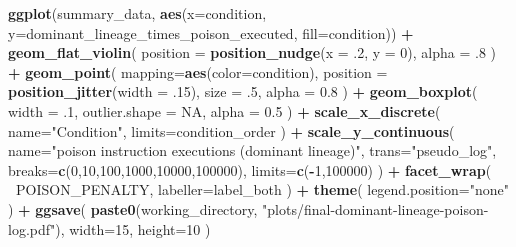 \documentclass[]{book}
\newenvironment{Shaded}{\begin{snugshade}}{\end{snugshade}}
\newcommand{\DataTypeTok}[1]{\textcolor[rgb]{0.13,0.29,0.53}{#1}}
\newcommand{\DecValTok}[1]{\textcolor[rgb]{0.00,0.00,0.81}{#1}}
\newcommand{\FloatTok}[1]{\textcolor[rgb]{0.00,0.00,0.81}{#1}}
\newcommand{\KeywordTok}[1]{\textcolor[rgb]{0.13,0.29,0.53}{\textbf{#1}}}
\newcommand{\NormalTok}[1]{#1}
\newcommand{\OperatorTok}[1]{\textcolor[rgb]{0.81,0.36,0.00}{\textbf{#1}}}
\newcommand{\OtherTok}[1]{\textcolor[rgb]{0.56,0.35,0.01}{#1}}
\newcommand{\StringTok}[1]{\textcolor[rgb]{0.31,0.60,0.02}{#1}}
\begin{document}
\begin{Shaded}
\begin{Highlighting}[]
\KeywordTok{ggplot}\NormalTok{(summary_data, }\KeywordTok{aes}\NormalTok{(}\DataTypeTok{x=}\NormalTok{condition, }\DataTypeTok{y=}\NormalTok{dominant_lineage_times_poison_executed, }\DataTypeTok{fill=}\NormalTok{condition)) }\OperatorTok{+}
\StringTok{  }\KeywordTok{geom_flat_violin}\NormalTok{(}
    \DataTypeTok{position =} \KeywordTok{position_nudge}\NormalTok{(}\DataTypeTok{x =} \FloatTok{.2}\NormalTok{, }\DataTypeTok{y =} \DecValTok{0}\NormalTok{),}
    \DataTypeTok{alpha =} \FloatTok{.8}
\NormalTok{  ) }\OperatorTok{+}
\StringTok{  }\KeywordTok{geom_point}\NormalTok{(}
    \DataTypeTok{mapping=}\KeywordTok{aes}\NormalTok{(}\DataTypeTok{color=}\NormalTok{condition),}
    \DataTypeTok{position =} \KeywordTok{position_jitter}\NormalTok{(}\DataTypeTok{width =} \FloatTok{.15}\NormalTok{),}
    \DataTypeTok{size =} \FloatTok{.5}\NormalTok{,}
    \DataTypeTok{alpha =} \FloatTok{0.8}
\NormalTok{  ) }\OperatorTok{+}
\StringTok{  }\KeywordTok{geom_boxplot}\NormalTok{(}
    \DataTypeTok{width =} \FloatTok{.1}\NormalTok{,}
    \DataTypeTok{outlier.shape =} \OtherTok{NA}\NormalTok{,}
    \DataTypeTok{alpha =} \FloatTok{0.5}
\NormalTok{  ) }\OperatorTok{+}
\StringTok{  }\KeywordTok{scale_x_discrete}\NormalTok{(}
    \DataTypeTok{name=}\StringTok{"Condition"}\NormalTok{,}
    \DataTypeTok{limits=}\NormalTok{condition_order}
\NormalTok{  ) }\OperatorTok{+}
\StringTok{  }\KeywordTok{scale_y_continuous}\NormalTok{(}
    \DataTypeTok{name=}\StringTok{"poison instruction executions (dominant lineage)"}\NormalTok{,}
    \DataTypeTok{trans=}\StringTok{"pseudo_log"}\NormalTok{,}
    \DataTypeTok{breaks=}\KeywordTok{c}\NormalTok{(}\DecValTok{0}\NormalTok{,}\DecValTok{10}\NormalTok{,}\DecValTok{100}\NormalTok{,}\DecValTok{1000}\NormalTok{,}\DecValTok{10000}\NormalTok{,}\DecValTok{100000}\NormalTok{),}
    \DataTypeTok{limits=}\KeywordTok{c}\NormalTok{(}\OperatorTok{-}\DecValTok{1}\NormalTok{,}\DecValTok{100000}\NormalTok{)}
\NormalTok{  ) }\OperatorTok{+}
\StringTok{  }\KeywordTok{facet_wrap}\NormalTok{(}
    \OperatorTok{~}\NormalTok{POISON_PENALTY,}
    \DataTypeTok{labeller=}\NormalTok{label_both}
\NormalTok{  ) }\OperatorTok{+}
\StringTok{  }\KeywordTok{theme}\NormalTok{(}
    \DataTypeTok{legend.position=}\StringTok{"none"}
\NormalTok{  ) }\OperatorTok{+}
\StringTok{  }\KeywordTok{ggsave}\NormalTok{(}
    \KeywordTok{paste0}\NormalTok{(working_directory, }\StringTok{"plots/final-dominant-lineage-poison-log.pdf"}\NormalTok{),}
    \DataTypeTok{width=}\DecValTok{15}\NormalTok{,}
    \DataTypeTok{height=}\DecValTok{10}
\NormalTok{  )}
\end{Highlighting}
\end{Shaded}
\end{document}
